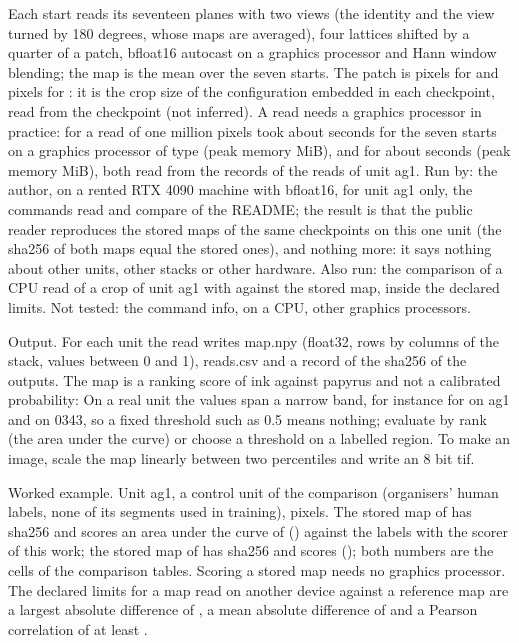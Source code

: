 Each start reads its seventeen planes with two views (the identity and the view turned by 180 degrees, whose maps are averaged), four lattices shifted by a quarter of a patch, bfloat16 autocast on a graphics processor and Hann window blending; the map is the mean over the seven starts. The patch is \UsagePatchOne{} pixels for \UsageNameOne{} and \UsagePatchTwo{} pixels for \UsageNameTwo{}: it is the crop size of the configuration embedded in each checkpoint, read from the checkpoint (not inferred). A read needs a graphics processor in practice: for \UsageNameTwo{} a read of one million pixels took about \UsageSecPerMpxTwo{} seconds for the seven starts on a graphics processor of type \UsageDeviceTwo{} (peak memory \UsagePeakTwo{} MiB), and for \UsageNameOne{} about \UsageSecPerMpxOne{} seconds (peak memory \UsagePeakOne{} MiB), both read from the records of the reads of unit ag1. Run by: the author, on a rented RTX 4090 machine with bfloat16, for unit ag1 only, the commands read and compare of the README; the result is that the public reader reproduces the stored maps of the same checkpoints on this one unit (the sha256 of both maps equal the stored ones), and nothing more: it says nothing about other units, other stacks or other hardware. Also run: the comparison of a CPU read of a crop of unit ag1 with \UsageNameOne{} against the stored map, inside the declared limits. Not tested: the command info, \UsageNameTwo{} on a CPU, other graphics processors.

Output. For each unit the read writes map.npy (float32, rows by columns of the stack, values between 0 and 1), reads.csv and a record of the sha256 of the outputs. The map is a ranking score of ink against papyrus and not a calibrated probability: \UsageCalibration{} \LabelSmoothing{} On a real unit the values span a narrow band, for instance \UsageBandOne{} for \UsageNameTwo{} on ag1 and \UsageBandTwo{} on 0343, so a fixed threshold such as 0.5 means nothing; evaluate by rank (the area under the curve) or choose a threshold on a labelled region. To make an image, scale the map linearly between two percentiles and write an 8 bit tif.

Worked example. Unit ag1, a control unit of the comparison (organisers' human labels, none of its segments used in training), \UsageShapeOne{} pixels. The stored map of \UsageNameOne{} has sha256 \UsageShaOne{} and scores an area under the curve of \UsageAucOne{} (\UsageAucOneFull{}) against the labels with the scorer of this work; the stored map of \UsageNameTwo{} has sha256 \UsageShaTwo{} and scores \UsageAucTwo{} (\UsageAucTwoFull{}); both numbers are the cells of the comparison tables. Scoring a stored map needs no graphics processor. The declared limits for a map read on another device against a reference map are a largest absolute difference of \UsageTolAbs{}, a mean absolute difference of \UsageTolMean{} and a Pearson correlation of at least \UsageTolPearson{}.


